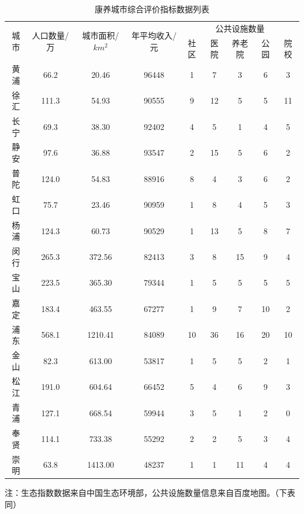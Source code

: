 \documentclass[12pt,a4paper]{article}
\begin{document}
\begin{table}[h]
  \centering
  \caption{康养城市综合评价指标数据列表}
  \begin{adjustbox}{width=\textwidth}
  \begin{tabular}{c|c|c|c|ccccc}
    \toprule[2pt]
    \multirow{2}{*}{城市} & \multirow{2}{*}{人口数量/万} & \multirow{2}{*}{城市面积/$km^2$}& \multirow{2}{*}{年平均收入/元}& \multicolumn{5}{c}{公共设施数量}\\
    \cline{5-9}
    & & & & 社区 & 医院 & 养老院 & 公园 & 院校\\
    \midrule[1pt]
    黄浦 & 66.2 & 20.46 & 96448 & 1 & 7 & 3 & 6 & 3 \\
    徐汇 & 111.3 & 54.93 & 90555 & 9 & 12 & 5 & 5 & 11 \\
    长宁 & 69.3 & 38.30 & 92402 & 4 & 5 & 1 & 4 & 5 \\
    静安 & 97.6 & 36.88 & 93547 & 2 & 15 & 5 & 6 & 2 \\
    普陀 & 124.0 & 54.83 & 88916 & 8 & 4 & 3 & 6 & 2 \\
    虹口 & 75.7 & 23.46 & 90959 & 1 & 8 & 4 & 5 & 3 \\
    杨浦 & 124.3 & 60.73 & 90529 & 1 & 13 & 5 & 8 & 7 \\
    闵行 & 265.3 & 372.56 & 82413 & 3 & 8 & 15 & 9 & 4 \\
    宝山 & 223.5 & 365.30 & 79344 & 1 & 5 & 5 & 5 & 5 \\
    嘉定 & 183.4 & 463.55 & 67277 & 1 & 9 & 7 & 10 & 2 \\
    浦东 & 568.1 & 1210.41 & 84089 & 10 & 36 & 16 & 20 & 10 \\
    金山 & 82.3 & 613.00 & 53817 & 1 & 5 & 5 & 2 & 1 \\
    松江 & 191.0 & 604.64 & 66452 & 5 & 4 & 6 & 9 & 3 \\
    青浦 & 127.1 & 668.54 & 59944 & 3 & 5 & 1 & 2 & 0 \\
    奉贤 & 114.1 & 733.38 & 55292 & 2 & 2 & 5 & 3 & 4 \\
    崇明 & 63.8 & 1413.00 & 48237 & 1 & 1 & 11 & 4 & 4 \\
    \bottomrule[2pt]
  \end{tabular}
  \end{adjustbox}

  \vspace{0.5em}
  {\footnotesize 注：生态指数数据来自中国生态环境部，公共设施数量信息来自百度地图。（下表同）}
\end{table}
\end{document}
